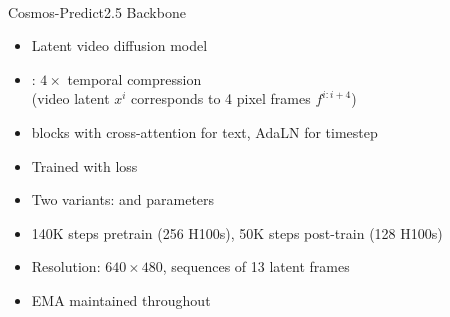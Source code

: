 
\begin{frame}[plain]
\begin{center}
\vfill
{\Huge{}}\\[1em]
{\large{}}
\vfill
\end{center}
\end{frame}

\begin{frame}{Cosmos-Predict2.5 Backbone}
\begin{methodbox}[Foundation]
\begin{itemize}
    \item Latent video diffusion model
          \citep{ali2025world}
    \item {}:
          $4\times$ temporal compression\\
          {\small (video latent $x^i$ corresponds to
          4 pixel frames $f^{i:i+4}$)}
    \item {} blocks \citep{peebles2023scalable}
          with cross-attention for text,
          AdaLN for timestep
    \item Trained with  loss
    \item Two variants:  and  parameters
\end{itemize}
\end{methodbox}

\vspace{0.3em}
\begin{itemize}
    \item 140K steps pretrain (256 H100s),
          50K steps post-train (128 H100s)
    \item Resolution: $640 \times 480$,
          sequences of 13 latent frames
    \item EMA maintained throughout
\end{itemize}
\end{frame}


